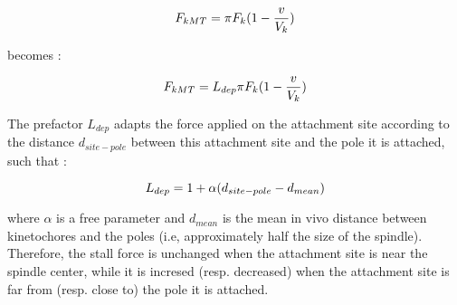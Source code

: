 \documentclass[a4paper,12pt]{article}
\begin{document}
\begin{equation}
F_{kMT}= \pi F_k (1 - \frac{v}{V_k})\\
\end{equation}

becomes :

\begin{equation}
F_{kMT}= L_{dep} \pi F_k (1 - \frac{v}{V_k})\\
\end{equation}

The prefactor $L_{dep}$ adapts the force applied on the attachment site according to the distance $d_{site-pole}$ between this attachment site and the pole it is attached, such that :
 
\begin{equation}
L_{dep} = 1 + \alpha(d_{site-pole} - d_{mean})\\
\end{equation}

where $\alpha$ is a free parameter and $d_{mean}$ is the mean in vivo distance between kinetochores and the poles (i.e, approximately half the size of the spindle). Therefore, the stall force is unchanged when the attachment site is near the spindle center, while it is incresed (resp. decreased) when the attachment site is far from (resp. close to) the pole it is attached.     
\end{document}
